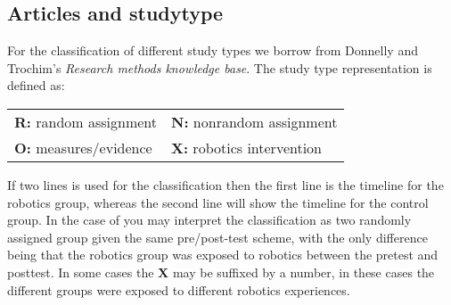 \subsection{Articles and studytype}
For the classification of different study types we borrow from Donnelly and Trochim's \textit{Research methods knowledge base}\cite{donnelly2007research}. 
The study type representation is defined as:

\bigskip\noindent
\begin{center}
	\begin{tabular}{ll}
		\textbf{R:} random assignment & \textbf{N:} nonrandom assignment\\
		\textbf{O:} measures/evidence & \textbf{X:} robotics intervention
		\label{tab:typedesc}
	\end{tabular}
\end{center}

\bigskip\noindent
If two lines is used for the classification then the first line is the timeline for the robotics group, whereas the second line will show the timeline for the control group.
In the case of  you may interpret the classification as two randomly assigned group given the same pre/post-test scheme, with the only difference being that the robotics group was exposed to robotics between the pretest and posttest. In some cases the \textbf{X} may be suffixed by a number, in these cases the different groups were exposed to different robotics experiences.



